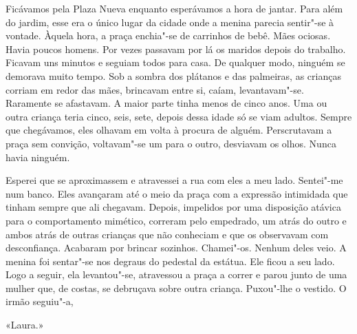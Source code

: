 Ficávamos pela Plaza Nueva enquanto esperávamos a hora de jantar. Para
além do jardim, esse era o único lugar da cidade onde a menina parecia
sentir"-se à vontade. Àquela hora, a praça enchia"-se de carrinhos de
bebê. Mães ociosas. Havia poucos homens. Por vezes passavam por lá os
maridos depois do trabalho. Ficavam uns minutos e seguiam todos para
casa. De qualquer modo, ninguém se demorava muito tempo. Sob a sombra
dos plátanos e das palmeiras, as crianças corriam em redor das mães,
brincavam entre si, caíam, levantavam"-se. Raramente se afastavam. A
maior parte tinha menos de cinco anos. Uma ou outra criança teria cinco,
seis, sete, depois dessa idade só se viam adultos. Sempre que
chegávamos, eles olhavam em volta à procura de alguém. Perscrutavam a
praça sem convição, voltavam"-se um para o outro, desviavam os olhos.
Nunca havia ninguém.

Esperei que se aproximassem e atravessei a rua com eles a meu lado.
Sentei"-me num banco. Eles avançaram até o meio da praça com a
expressão intimidada que tinham sempre que ali chegavam. Depois,
impelidos por uma disposição atávica para o comportamento mimético,
correram pelo empedrado, um atrás do outro e ambos atrás de outras
crianças que não conheciam e que os observavam com desconfiança.
Acabaram por brincar sozinhos. Chamei"-os. Nenhum deles veio. A menina
foi sentar"-se nos degraus do pedestal da estátua. Ele ficou a seu lado.
Logo a seguir, ela levantou"-se, atravessou a praça a correr e parou
junto de uma mulher que, de costas, se debruçava sobre outra criança.
Puxou"-lhe o vestido. O irmão seguiu"-a,

«Laura.»

